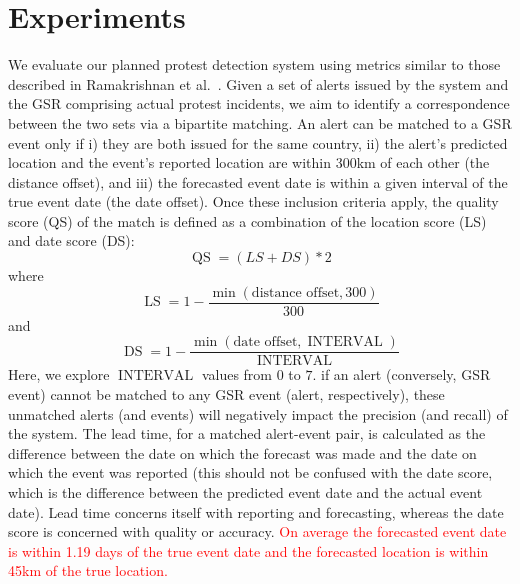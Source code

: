 \documentclass[letterpaper]{article}
\begin{document}
\vspace{-0.5em}
\section{Experiments}
We evaluate our planned protest detection system
using metrics similar to those described in 
Ramakrishnan et al.~\cite{emberskdd}.
Given a set of alerts issued by the system and the GSR comprising actual protest incidents, we aim to identify
a correspondence between the two sets via a bipartite matching.
An alert can be matched to a GSR event only if i) they are both issued for the same country, 
ii) the alert's predicted location and the event's reported location are within 300km of each
other (the distance offset), and iii) the forecasted event date is within a given interval of the true event date (the date offset).
Once these inclusion criteria apply, the quality score (QS) of the match is defined as a combination of the
location score (LS) and date score (DS):
\small
\begin{equation}
    \operatorname{QS}= (LS + DS)*2
\end{equation}
\normalsize
\noindent
where
\small
\begin{equation}
    \operatorname{LS}=1 - \frac{\min(\textrm{distance offset}, 300)}{300}
\end{equation}
and 
\begin{equation}
    \operatorname{DS}=1 - \frac{\min(\textrm{date offset}, \operatorname{INTERVAL})}{\operatorname{INTERVAL}}
\end{equation}
\normalsize
Here, we explore $\operatorname{INTERVAL}$ values from $0$ to $7$.
if an alert (conversely, GSR event) cannot be matched to any GSR event (alert, respectively), these unmatched
alerts (and events) will negatively impact the precision (and recall) of the system. The lead time,
for a matched alert-event pair,
is calculated as the difference between the date on which the forecast was made and the date on which the event
was reported (this should not be confused with the date score, which is the difference between the
predicted event date and the actual event date). Lead time concerns itself with reporting and forecasting, whereas
the date score is concerned with quality or accuracy.
\textcolor{red}{
On average the forecasted event date is within 1.19 days of the true event date and the forecasted location is within 45km of the true location.}
\end{document}
